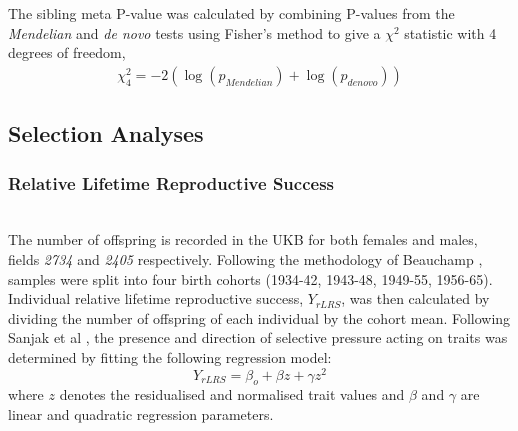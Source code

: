 \documentclass[times]{zHenriquesLab-StyleBioRxiv}
\begin{document}
The sibling meta P-value was calculated by combining P-values from the
{\em Mendelian} and {\em de novo} tests using Fisher's method to give
a $\chi^2$ statistic with 4 degrees of freedom,
\begin{align*}
    \chi^2_4 = -2(\log(p_{Mendelian}) + \log(p_{de novo}))
\end{align*}


\subsection*{Selection Analyses}
\subsubsection*{Relative Lifetime Reproductive Success} ~\\
The number of offspring is recorded in the UKB for both females and
males, fields \textit{2734} and \textit{2405} respectively.  Following
the methodology of Beauchamp \citep{v_select2}, samples were split
into four birth cohorts (1934-42, 1943-48, 1949-55,
1956-65). Individual relative
lifetime reproductive success, $Y_{rLRS}$, was then calculated by
dividing the number of offspring of each individual by the cohort
mean. Following Sanjak et al \citep{v_select}, the presence and
direction of selective pressure acting on traits was determined by
fitting the following regression model:
\begin{equation}
Y_{rLRS} = \beta_o + \beta z + \gamma z^2 \label{math:LRS}
\end{equation}
where $z$ denotes the residualised and normalised trait values and
$\beta$ and $\gamma$ are linear and quadratic regression parameters.
\end{document}

